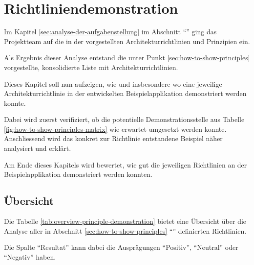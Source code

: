 \chapter{Richtliniendemonstration}
\label{sec:principle-demonstration}

Im Kapitel \ref{sec:analyse-der-aufgabenstellung} im Abschnitt ``'' ging das Projektteam auf die in der  vorgestellten Architekturrichtlinien und Prinzipien ein.

Als Ergebnis dieser Analyse entstand die unter Punkt \ref{sec:how-to-show-principles} vorgestellte, konsolidierte Liste mit Architekturrichtlinien.

Dieses Kapitel soll nun aufzeigen, wie und insbesondere wo eine jeweilige Architekturrichtlinie in der entwickelten Beispielapplikation demonstriert werden konnte.

Dabei wird zuerst verifiziert, ob die potentielle Demonstrationsstelle aus Tabelle \ref{fig:how-to-show-principles-matrix} wie erwartet umgesetzt werden konnte.
Anschliessend wird das konkret zur Richtlinie entstandene Beispiel näher analysiert und erklärt.

Am Ende dieses Kapitels wird bewertet, wie gut die jeweiligen Richtlinien an der Beispielapplikation demonstriert werden konnten.

\newpage
\section{Übersicht}

Die Tabelle \ref{tab:overview-principle-demonstration} bietet eine Übersicht über die Analyse aller in Abschnitt \ref{sec:how-to-show-principles} ``'' definierten Richtlinien.

Die Spalte ``Resultat'' kann dabei die Ausprägungen ``Positiv'', ``Neutral'' oder ``Negativ'' haben.

